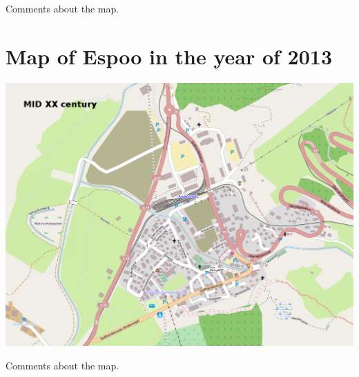 \documentclass[a4paper]{article}
\newcommand{\mycity}{Espoo\xspace}
\begin{document}
Comments about the map.

\newpage

\section{Map of \mycity in the year of 2013}
\includegraphics[keepaspectratio,width=\textwidth]{map2}

Comments about the map.

\newpage

\end{document}
